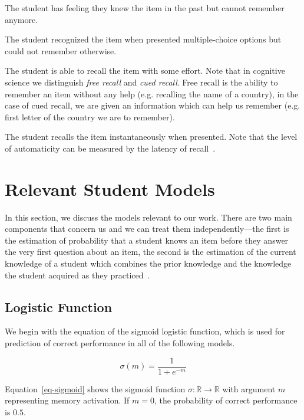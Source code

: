 \begin{description}[leftmargin=0cm]
  \item[Familiarity] The student has feeling they knew the item in the past but cannot remember anymore.
  \item[Recognition] The student recognized the item when presented multiple-choice options but could not remember otherwise.
  \item[Recall] The student is able to recall the item with some effort. Note that in cognitive science we distinguish \textit{free recall} and \textit{cued recall}. Free recall is the ability to remember an item without any help (e.g. recalling the name of a country), in the case of cued recall, we are given an information which can help us remember (e.g. first letter of the country we are to remember).
  \item[Automaticity] The student recalls the item instantaneously when presented. Note that the level of automaticity can be measured by the latency of recall~\cite{Lewis}.
\end{description}

\section{Relevant Student Models}
\label{relevant-models}

In this section, we discuss the models relevant to our work. There are two main components that concern us and we can treat them independently---the first is the estimation of probability that a student knows an item before they answer the very first question about an item, the second is the estimation of the current knowledge of a student which combines the prior knowledge and the knowledge the student acquired as they practiced~\cite{Papousek2014}.

\subsection{Logistic Function}

We begin with the equation of the sigmoid logistic function, which is used for prediction of correct performance in all of the following models.

\begin{equation} \label{eq-sigmoid}
  \sigma(m) = \frac{1}{1 + e^{-m}}
\end{equation}

Equation~\ref{eq-sigmoid} shows the sigmoid function $\sigma : \mathbb{R} \rightarrow \mathbb{R}$ with argument $m$ representing memory activation. If $m = 0$, the probability of correct performance is $0.5$.

